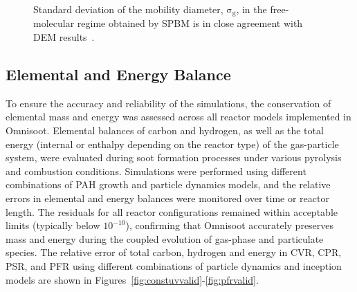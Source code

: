 \begin{figure}[H]
	\centering
	\begin{subfigure}[t]{0.4\textwidth}
	\end{subfigure}
	\caption{Standard deviation of the mobility diameter, $\mathrm{\sigma_g}$, in the free-molecular regime obtained by SPBM is in close agreement with DEM results~\citep{kholghy2021surface}.}
	\label{fig:coagvalid_sigma} 
\end{figure}


\subsection{Elemental and Energy Balance}

\noindent To ensure the accuracy and reliability of the simulations, the conservation of elemental mass and energy was assessed across all reactor models implemented in Omnisoot. Elemental balances of carbon and hydrogen, as well as the total energy (internal or enthalpy depending on the reactor type) of the gas-particle system, were evaluated during soot formation processes under various pyrolysis and combustion conditions.
Simulations were performed using different combinations of PAH growth and particle dynamics models, and the relative errors in elemental and energy balances were monitored over time or reactor length. The residuals for all reactor configurations remained within acceptable limits (typically below $10^{-10}$), confirming that Omnisoot accurately preserves mass and energy during the coupled evolution of gas-phase and particulate species. The relative error of total carbon, hydrogen and energy in CVR, CPR, PSR, and PFR using different combinations of particle dynamics and inception models are shown in Figures~\ref{fig:constuvvalid}-\ref{fig:pfrvalid}.
 
